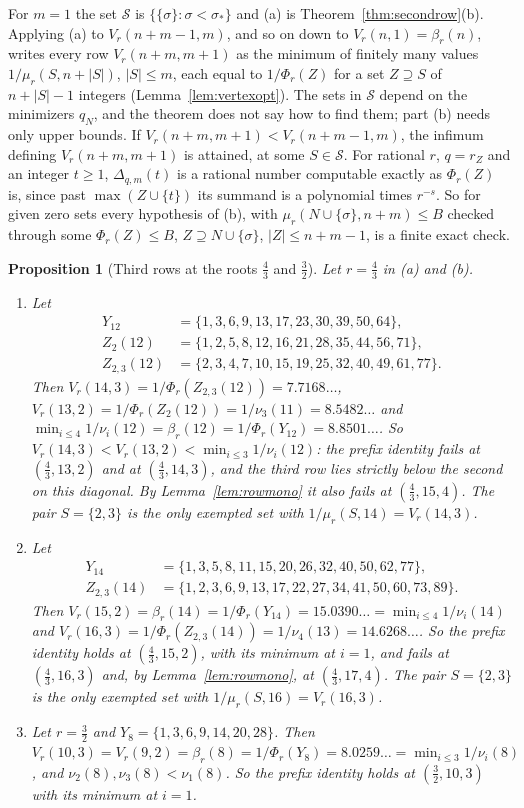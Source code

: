 \documentclass[11pt]{article}
\newtheorem{proposition}[theorem]{Proposition}
\begin{document}
For $m=1$ the set $\mathcal S$ is $\{\{\sigma\}:\sigma<\sigma_*\}$ and (a) is
Theorem~\ref{thm:secondrow}(b).  Applying (a) to $V_r(n+m-1,m)$, and so on
down to $V_r(n,1)=\beta_r(n)$, writes every row $V_r(n+m,m+1)$ as the
minimum of finitely many values $1/\mu_r(S,n+|S|)$, $|S|\le m$, each equal
to $1/\Phi_r(Z)$ for a set $Z\supseteq S$ of $n+|S|-1$ integers
(Lemma~\ref{lem:vertexopt}).  The sets in $\mathcal S$ depend on the
minimizers $q_N$, and the theorem does not say how to find them; part (b)
needs only upper bounds.  If $V_r(n+m,m+1)<V_r(n+m-1,m)$, the infimum
defining $V_r(n+m,m+1)$ is attained, at some $S\in\mathcal S$.  For rational
$r$, $q=r_Z$ and an integer $t\ge1$, $\Delta_{q,m}(t)$ is a rational number
computable exactly
as $\Phi_r(Z)$ is, since past $\max(Z\cup\{t\})$ its summand is a polynomial
times $r^{-s}$.  So for given zero sets every hypothesis of (b), with
$\mu_r(N\cup\{\sigma\},n+m)\le B$ checked through some $\Phi_r(Z)\le B$,
$Z\supseteq N\cup\{\sigma\}$, $|Z|\le n+m-1$, is a finite exact check.

\begin{proposition}[Third rows at the roots $\frac43$ and $\frac32$]\label{prop:thirdrowexact}
Let $r=\frac43$ in (a) and (b).
\begin{enumerate}
\item[(a)] Let
\begin{align*}
  Y_{12}&=\{1,3,6,9,13,17,23,30,39,50,64\},\\
  Z_2(12)&=\{1,2,5,8,12,16,21,28,35,44,56,71\},\\
  Z_{2,3}(12)&=\{2,3,4,7,10,15,19,25,32,40,49,61,77\}.
\end{align*}
Then $V_r(14,3)=1/\Phi_r(Z_{2,3}(12))=7.7168\ldots$,
$V_r(13,2)=1/\Phi_r(Z_2(12))=1/\nu_3(11)=8.5482\ldots$ and
$\min_{i\le4}1/\nu_i(12)=\beta_r(12)=1/\Phi_r(Y_{12})=8.8501\ldots$.  So
$V_r(14,3)<V_r(13,2)<\min_{i\le3}1/\nu_i(12)$: the prefix identity fails at
$(\frac43,13,2)$ and at $(\frac43,14,3)$, and the third row lies strictly
below the second on this diagonal.  By Lemma~\ref{lem:rowmono} it also
fails at $(\frac43,15,4)$.  The pair $S=\{2,3\}$ is the only
exempted set with $1/\mu_r(S,14)=V_r(14,3)$.
\item[(b)] Let
\begin{align*}
  Y_{14}&=\{1,3,5,8,11,15,20,26,32,40,50,62,77\},\\
  Z_{2,3}(14)&=\{1,2,3,6,9,13,17,22,27,34,41,50,60,73,89\}.
\end{align*}
Then $V_r(15,2)=\beta_r(14)=1/\Phi_r(Y_{14})=15.0390\ldots=\min_{i\le4}1/\nu_i(14)$
and $V_r(16,3)=1/\Phi_r(Z_{2,3}(14))=1/\nu_4(13)=14.6268\ldots$.  So the
prefix identity holds at $(\frac43,15,2)$, with its minimum at $i=1$, and
fails at $(\frac43,16,3)$ and, by Lemma~\ref{lem:rowmono}, at
$(\frac43,17,4)$.  The pair $S=\{2,3\}$ is the only exempted set
with $1/\mu_r(S,16)=V_r(16,3)$.
\item[(c)] Let $r=\frac32$ and $Y_8=\{1,3,6,9,14,20,28\}$.  Then
$V_r(10,3)=V_r(9,2)=\beta_r(8)=1/\Phi_r(Y_8)=8.0259\ldots=\min_{i\le3}1/\nu_i(8)$,
and $\nu_2(8),\nu_3(8)<\nu_1(8)$.  So the prefix identity holds at
$(\frac32,10,3)$ with its minimum at $i=1$.
\end{enumerate}
\end{proposition}
\end{document}

